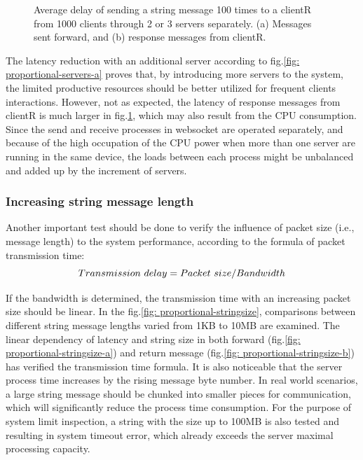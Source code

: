 \begin{figure}[htb]
\begin{subfigure}[b]{0.49\textwidth}
        \caption{} \label{fig: proportional-servers-b}
        \end{subfigure}
    \caption{Average delay of sending a string message 100 times 
    to a clientR from 1000 clients through 2 or 3 servers separately. (a) Messages sent forward, 
    and (b) response messages from clientR. 
    \label{fig: proportional-servers}}
\end{figure}

The latency reduction with an additional server according to 
fig.\ref{fig: proportional-servers-a} proves that, by introducing more servers 
to the system, the limited productive resources should be better utilized 
for frequent clients interactions. However, not as expected, the latency of 
response messages from clientR is much larger in fig.\ref{fig: proportional-servers-b},
which may also result from the CPU consumption. Since the send and receive 
processes in websocket are operated separately, and because of the high 
occupation of the CPU power when more than one server are running in the same 
device, the loads between each process might be unbalanced and added up by the 
increment of servers. 


\subsubsection{Increasing string message length}\label{chap: Result-Internal-string}
Another important test should be done to verify the influence of packet size (i.e., 
message length) to the system performance, according to the formula of packet 
transmission time: 
\begin{equation}
    Transmission $ $ delay = Packet $ $ size/Bandwidth
\end{equation}

If the bandwidth is determined, the transmission time with an increasing packet 
size should be linear. In the fig.\ref{fig: proportional-stringsize}, comparisons 
between different string message lengths varied from 1KB to 10MB are examined. 
The linear dependency of latency and string size in both forward 
(fig.\ref{fig: proportional-stringsize-a}) and return message (fig.\ref{fig: proportional-stringsize-b}) 
has verified the transmission time formula. It is also noticeable that the server 
process time increases by the rising message byte number. In real world scenarios, 
a large string message should be chunked into smaller pieces for communication, 
which will significantly reduce the process time consumption. For the purpose of system limit 
inspection, a string with the size up to 100MB is also tested and resulting in 
system timeout error, which already exceeds the server maximal 
processing capacity. 



